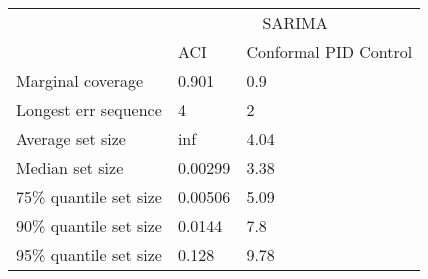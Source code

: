 \begin{tabular}{lll}
\toprule
& \multicolumn{2}{c}{SARIMA} \\
& ACI & Conformal PID Control \\
\midrule
Marginal coverage & 0.901 & 0.9 \\
Longest err sequence & 4 & 2 \\
Average set size & inf & 4.04 \\
Median set size & 0.00299 & 3.38 \\
75\% quantile set size & 0.00506 & 5.09 \\
90\% quantile set size & 0.0144 & 7.8 \\
95\% quantile set size & 0.128 & 9.78 \\
\bottomrule
\end{tabular}
